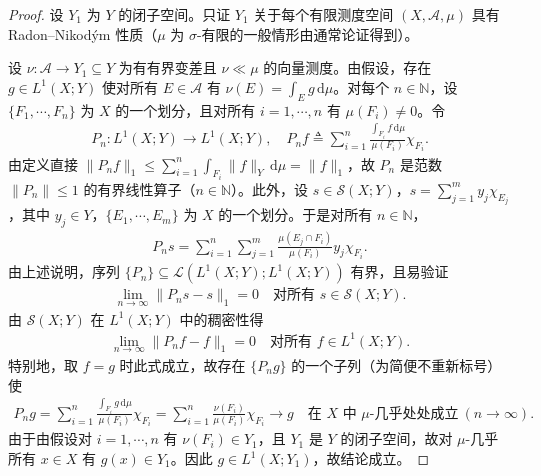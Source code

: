 \documentclass[../../main.tex]{subfiles}%
\begin{document}
\begin{proof}
设 $Y_1$ 为 $Y$ 的闭子空间。只证 $Y_1$ 关于每个有限测度空间 $(X,\mathcal{A},\mu)$ 具有 Radon--Nikodým 性质（$\mu$ 为 $\sigma$-有限的一般情形由通常论证得到）。

设 $\nu:\mathcal{A}\to Y_1\subseteq Y$ 为有有界变差且 $\nu\ll\mu$ 的向量测度。由假设，存在 $g\in L^1(X;Y)$ 使对所有 $E\in\mathcal{A}$ 有 $\nu(E)=\int_E g\,\mathrm{d}\mu$。对每个 $n\in\mathbb{N}$，设 $\{F_1,\cdots,F_n\}$ 为 $X$ 的一个划分，且对所有 $i=1,\cdots,n$ 有 $\mu(F_i)\neq0$。令
\begin{align*}
P_n:L^1(X;Y)\to L^1(X;Y),\quad P_nf\triangleq \sum_{i=1}^n\frac{\int_{F_i}f\,\mathrm{d}\mu}{\mu(F_i)}\chi_{F_i}.
\end{align*}
由定义直接 $\|P_nf\|_1\leqslant\sum_{i=1}^n\int_{F_i}\|f\|_Y\,\mathrm{d}\mu=\|f\|_1$，故 $P_n$ 是范数 $\|P_n\|\leqslant1$ 的有界线性算子（$n\in\mathbb{N}$）。此外，设 $s\in\mathcal{S}(X;Y)$，$s=\sum_{j=1}^my_j\chi_{E_j}$，其中 $y_j\in Y$，$\{E_1,\cdots,E_m\}$ 为 $X$ 的一个划分。于是对所有 $n\in\mathbb{N}$，
\begin{align*}
P_ns=\sum_{i=1}^n\sum_{j=1}^m\frac{\mu(E_j\cap F_i)}{\mu(F_i)}y_j\chi_{F_i}.
\end{align*}
由上述说明，序列 $\{P_n\}\subseteq\mathcal{L}(L^1(X;Y);L^1(X;Y))$ 有界，且易验证
\begin{align*}
\lim_{n\to\infty}\|P_ns-s\|_1=0\quad\text{对所有 }s\in\mathcal{S}(X;Y).
\end{align*}
由 $\mathcal{S}(X;Y)$ 在 $L^1(X;Y)$ 中的稠密性得
\begin{align*}
\lim_{n\to\infty}\|P_nf-f\|_1=0\quad\text{对所有 }f\in L^1(X;Y).
\end{align*}
特别地，取 $f=g$ 时此式成立，故存在 $\{P_ng\}$ 的一个子列（为简便不重新标号）使
\begin{align*}
P_ng=\sum_{i=1}^n\frac{\int_{F_i}g\,\mathrm{d}\mu}{\mu(F_i)}\chi_{F_i}=\sum_{i=1}^n\frac{\nu(F_i)}{\mu(F_i)}\chi_{F_i}\to g\quad\text{在 }X\text{ 中 }\mu\text{-几乎处处成立}\ (n\to\infty).
\end{align*}
由于由假设对 $i=1,\cdots,n$ 有 $\nu(F_i)\in Y_1$，且 $Y_1$ 是 $Y$ 的闭子空间，故对 $\mu$-几乎所有 $x\in X$ 有 $g(x)\in Y_1$。因此 $g\in L^1(X;Y_1)$，故结论成立。
\end{proof}
\end{document}
